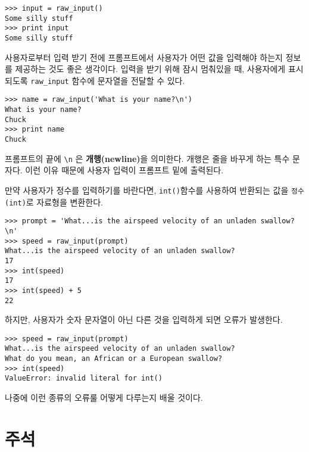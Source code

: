\beforeverb
\begin{verbatim}
>>> input = raw_input()
Some silly stuff
>>> print input
Some silly stuff
\end{verbatim}
\afterverb
%

사용자로부터 입력 받기 전에 프롬프트에서 사용자가 어떤 값을 입력해야 하는지 정보를 제공하는 것도 좋은 생각이다. 
입력을 받기 위해 잠시 멈춰있을 때, 사용자에게 표시되도록 \verb"raw_input" 함수에 문자열을 전달할 수 있다.


\beforeverb
\begin{verbatim}
>>> name = raw_input('What is your name?\n')
What is your name?
Chuck
>>> print name
Chuck
\end{verbatim}
\afterverb
%

프롬프트의 끝에 \verb"\n" 은 {\bf 개행(newline)}을 의미한다. 개행은 줄을 바꾸게 하는 특수 문자다. 
이런 이유 때문에 사용자 입력이 프롬프트 밑에 출력된다.


만약 사용자가 정수를 입력하기를 바란다면, 
{\tt int()}함수를 사용하여 반환되는 값을 {\tt 정수(int)}로 자료형을 변환한다.

\beforeverb
\begin{verbatim}
>>> prompt = 'What...is the airspeed velocity of an unladen swallow?\n'
>>> speed = raw_input(prompt)
What...is the airspeed velocity of an unladen swallow?
17
>>> int(speed)
17
>>> int(speed) + 5
22
\end{verbatim}
\afterverb
%

하지만, 사용자가 숫자 문자열이 아닌 다른 것을 입력하게 되면 오류가 발생한다.

\beforeverb
\begin{verbatim}
>>> speed = raw_input(prompt)
What...is the airspeed velocity of an unladen swallow?
What do you mean, an African or a European swallow?
>>> int(speed)
ValueError: invalid literal for int()
\end{verbatim}
\afterverb
%

나중에  이런 종류의 오류룰 어떻게 다루는지 배울 것이다.



\section{주석}

